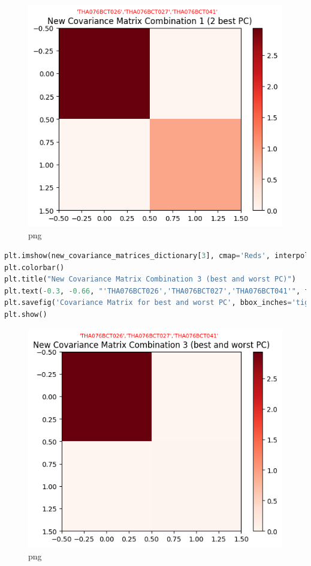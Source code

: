 \documentclass[
]{article}
\begin{document}
\begin{figure}
\centering
\includegraphics{PCA on IRIS_files/PCA on IRIS_42_0.png}
\caption{png}
\end{figure}

\begin{lstlisting}[language=Python]
plt.imshow(new_covariance_matrices_dictionary[3], cmap='Reds', interpolation='nearest')
plt.colorbar()
plt.title("New Covariance Matrix Combination 3 (best and worst PC)")
plt.text(-0.3, -0.66, "'THA076BCT026','THA076BCT027','THA076BCT041'", fontsize=8,color='red')
plt.savefig('Covariance Matrix for best and worst PC', bbox_inches='tight')
plt.show()
\end{lstlisting}

\begin{figure}
\centering
\includegraphics{PCA on IRIS_files/PCA on IRIS_43_0.png}
\caption{png}
\end{figure}
\end{document}
